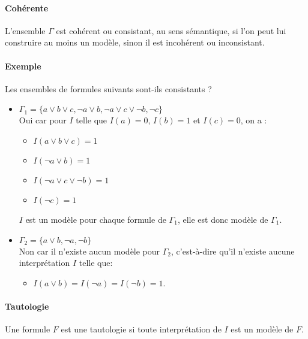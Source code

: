 \documentclass[11pt,twoside,openright,a4paper]{report}
\begin{document}

\paragraph{Cohérente} %
\label{par:coh_rente}

L'ensemble $\Gamma$ est cohérent ou consistant, au sens sémantique, si l'on peut lui construire au moins un modèle, sinon il est incohérent ou inconsistant.


\paragraph{Exemple} %
\label{par:exemple}

Les ensembles de formules suivants sont-ils consistants ?
\begin{itemize}
	\item $\Gamma_1 = \{a \lor b \lor c, \neg a \lor b, \neg a \lor c \lor \neg b, \neg c\}$\\
	Oui car pour $I$ telle que $I(a)=0$, $I(b)=1$ et $I(c)=0$, on a :
	\begin{itemize}
		\item $I(a \lor b \lor c)=1$
		\item $I(\neg a \lor b)=1$
		\item $I(\neg a \lor c \lor \neg b)=1$
		\item $I(\neg c)=1$
	\end{itemize}
	$I$ est un modèle pour chaque formule de $\Gamma_1$, elle est donc modèle de $\Gamma_1$.

	\item $\Gamma_2 = \{a \lor b, \neg a, \neg b\}$\\
	Non car il n'existe aucun modèle pour $\Gamma_2$, c'est-à-dire qu'il n'existe aucune interprétation $I$ telle que:
	\begin{itemize}
		\item $I(a \lor b) = I(\neg a) = I(\neg b) =1$.
	\end{itemize}
\end{itemize}


\paragraph{Tautologie} %
\label{par:tautologie}

Une formule $F$ est une tautologie si toute interprétation de $I$ est un modèle de $F$.
\end{document}
